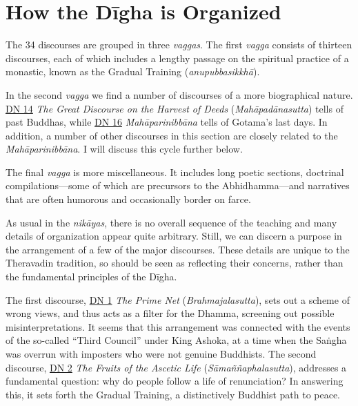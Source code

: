 \documentclass[12pt,openany]{book}%
\begin{document}
\section*{How the \textsanskrit{Dīgha} is Organized}

The 34 discourses are grouped in three \textit{vaggas}. The first \textit{vagga} consists of thirteen discourses, each of which includes a lengthy passage on the spiritual practice of a monastic, known as the Gradual Training (\textit{\textsanskrit{anupubbasikkhā}}).

In the second \textit{vagga} we find a number of discourses of a more biographical nature. \href{https://suttacentral.net/dn14}{DN 14} \textit{The Great Discourse on the Harvest of Deeds} (\textit{\textsanskrit{Mahāpadānasutta}}) tells of past Buddhas, while \href{https://suttacentral.net/dn16}{DN 16} \textit{\textsanskrit{Mahāparinibbāna}} tells of Gotama’s last days. In addition, a number of other discourses in this section are closely related to the \textit{\textsanskrit{Mahāparinibbāna}}. I will discuss this cycle further below.

The final \textit{vagga} is more miscellaneous. It includes long poetic sections, doctrinal compilations—some of which are precursors to the Abhidhamma—and narratives that are often humorous and occasionally border on farce.

As usual in the \textit{\textsanskrit{nikāyas}}, there is no overall sequence of the teaching and many details of organization appear quite arbitrary. Still, we can discern a purpose in the arrangement of a few of the major discourses. These details are unique to the Theravadin tradition, so should be seen as reflecting their concerns, rather than the fundamental principles of the \textsanskrit{Dīgha}.

The first discourse, \href{https://suttacentral.net/dn1}{DN 1} \textit{The Prime Net} (\textit{Brahmajalasutta}), sets out a scheme of wrong views, and thus acts as a filter for the Dhamma, screening out possible misinterpretations. It seems that this arrangement was connected with the events of the so-called “Third Council” under King Ashoka, at a time when the \textsanskrit{Saṅgha} was overrun with imposters who were not genuine Buddhists. The second discourse, \href{https://suttacentral.net/dn2}{DN 2} \textit{The Fruits of the Ascetic Life} (\textit{\textsanskrit{Sāmaññaphalasutta}}), addresses a fundamental question: why do people follow a life of renunciation? In answering this, it sets forth the Gradual Training, a distinctively Buddhist path to peace.
\end{document}

